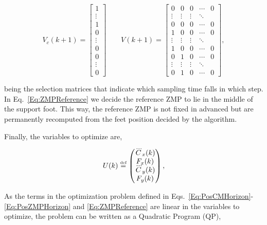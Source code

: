 \begin{equation*}
   V_c(k+1) = \begin{bmatrix}1 \\ \vdots \\ 1 \\ 0 \\ \vdots \\ 0 \\ 0 \\ \vdots \\ 0  \end{bmatrix} \qquad
   V(k+1) = \begin{bmatrix} 0 & 0 & 0 & \cdots & 0 \\ \vdots & \vdots
     & \vdots & \ddots\\ 
                                           0 & 0 & 0 & \cdots & 0\\
                           1 & 0 & 0 & \cdots & 0 \\ \vdots & \vdots &
                           \vdots &
                           \ddots \\ 1 & 0 & 0 &\cdots &0\\
                           0 & 1 & 0 & \cdots & 0\\ \vdots & \vdots &
                           \vdots & \ddots \\ 0 & 1 & 0 & \cdots &0\end{bmatrix},
\end{equation*}

being the selection matrices that indicate which sampling time falls in which step. In Eq.~\ref{Eq:ZMPReference} we decide the reference ZMP to lie in the middle of the support foot. This way, the reference ZMP is not fixed in advanced but are permanently recomputed from the feet position decided by the algorithm.

Finally, the variables to optimize are,

$$
U(k) \stackrel{\mbox{\tiny def}}{=} 
\left(
\begin{matrix}
\dddot{C}_{x}(k) \\
F_x(k) \\
\dddot{C}_{y}(k) \\
F_y(k)
\end{matrix}
\right),
$$

As the terms in the optimization problem defined in Eqs.~\ref{Eq:PosCMHorizon}-\ref{Eq:PosZMPHorizon} and \ref{Eq:ZMPReference} are linear in the variables to optimize, the problem can be written as a Quadratic Program (QP),

